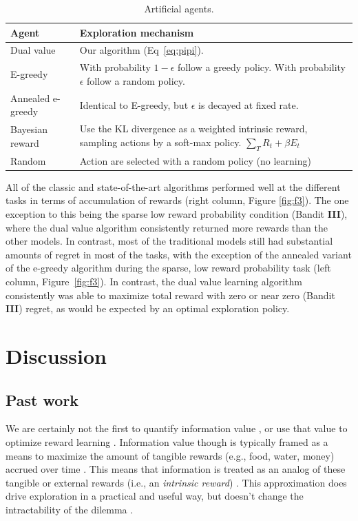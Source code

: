 \documentclass[9pt,twocolumn,twoside]{pnas-new}
\begin{document}
\begin{table}[] 
    \centering 
	\caption{Artificial agents.} \label{tab:agents} 
	\begin{tabular}
		{|l|L|} \hline \textbf{Agent} & \textbf{Exploration mechanism} \\
		\hline Dual value & Our algorithm (Eq~\ref{eq:pipi}). \\
		\hline E-greedy & With probability $1-\epsilon$ follow a greedy policy. With probability $\epsilon$ follow a random policy. \\
		\hline Annealed e-greedy & Identical to E-greedy, but $\epsilon$ is decayed at fixed rate. \\
		\hline Bayesian reward & Use the KL divergence as a weighted intrinsic reward, sampling actions by a soft-max policy. $\sum_T R_t + \beta E_t$ \\
		\hline Random & Action are selected with a random policy (no learning) \\
		\hline 
	\end{tabular}
\end{table}

All of the classic and state-of-the-art algorithms performed well at the different tasks in terms of accumulation of rewards (right column, Figure \ref{fig:f3}). The one exception to this being the sparse low reward probability condition (Bandit \textbf{III}), where the dual value algorithm consistently returned more rewards than the other models. In contrast, most of the traditional models still had substantial amounts of regret in most of the tasks, with the exception of the annealed variant of the e-greedy algorithm during the sparse, low reward probability task (left column, Figure~\ref{fig:f3}). In contrast, the dual value learning algorithm consistently was able to maximize total reward with zero or near zero (Bandit \textbf{III}) regret, as would be expected by an optimal exploration policy.


\section*{Discussion}
\subsection*{Past work}
We are certainly not the first to quantify information value \cite{Kolchinsky2018,CogliatiDezza2017}, or use that value to optimize reward learning \cite{Kelly1956,Schmidhuber1991,Dayan1996,deAbril2018,Itti2009}. Information value though is typically framed as a means to maximize the amount of tangible rewards (e.g., food, water, money) accrued over time \cite{Sutton2018}. This means that information is treated as an analog of these tangible or external rewards (i.e., an \textit{intrinsic reward}) \cite{Schmidhuber1991,Berger-Tal2014,Itti2009,Friston2016}. This approximation does drive exploration in a practical and useful way, but doesn't change the intractability of the dilemma \cite{Thrun1992a,Dayan1996,Findling2018,Gershman2018b}. 
\end{document}
